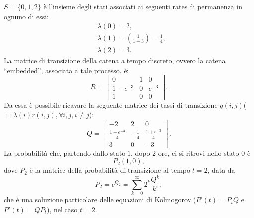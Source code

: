 \documentclass[12pt]{homework}
\begin{document}
\begin{alphaparts}
$S=\{0,1,2\}$ è l'insieme degli stati associati ai seguenti rates di permanenza in ognuno di essi:
  \begin{align*}
  &\lambda\left(0\right)=2,\\
  &\lambda\left(1\right)=\left(\frac{1}{1+3}\right)=\frac{1}{4},\\
  &\lambda\left(2\right)=3.
  \end{align*}
 La matrice di transizione della catena a tempo discreto, ovvero la catena ``embedded'', associata a tale processo, è:
 \begin{equation*}
  R=\begin{bmatrix}
        0 & 1 & 0\\
        1-e^{-3} & 0 & e^{-3} \\
         1 & 0 & 0
      \end{bmatrix}.
\end{equation*}  
Da essa è possibile ricavare la seguente matrice dei tassi di transizione $q\left(i,j\right)$($=\lambda\left(i\right)r\left(i,j\right),\forall i,j, i\neq j$):
\begin{equation*}
  Q=\begin{bmatrix}
        -2 & 2 & 0\\
        \frac{1-e^{-3}}{4} & -\frac{1}{4} &  \frac{1+e^{-3}}{4}\\
         3 & 0 & -3
      \end{bmatrix}.
\end{equation*}  
\questionpart
La probabilità che, partendo dallo stato $1$, dopo $2$ ore, ci si ritrovi nello stato $0$ è
\begin{equation*}
P_{2}\left(1,0\right),
\end{equation*} 
dove $P_{2}$ è la matrice della probabilità di transizione al tempo $t= 2$, data da
\begin{equation*}
P_{2}=e^{Q_{2}}= \sum_{k=0}^{\infty}2^{k}\frac{Q^{k}}{k!},
\end{equation*}
che è una soluzione particolare delle equazioni di Kolmogorov ($P'\left(t\right)=P_{t}Q$ e $P'\left(t\right)=QP_{t}$), nel caso $t=2$.


\end{alphaparts}
\end{document}
